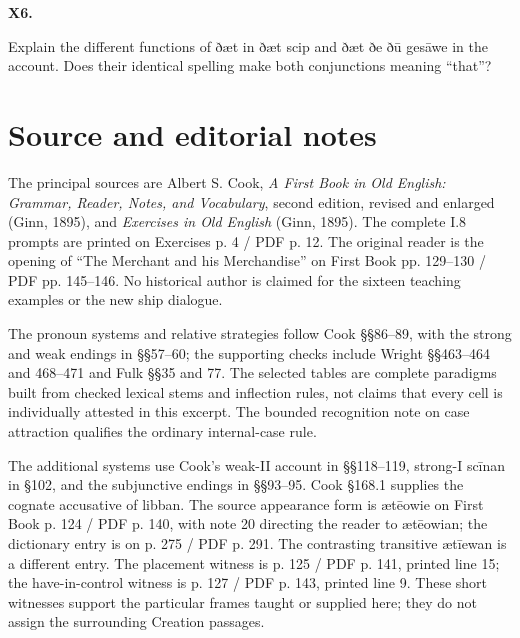 \par\begin{minipage}{\linewidth}\raggedright
\textbf{X6.}

Explain the different functions of ðæt in ðæt scip and ðæt ðe ðū gesāwe in the account. Does their identical spelling make both conjunctions meaning “that”?

\end{minipage}\par\addvspace{4pt}

\clearpage
\section*{Source and editorial notes}

\begingroup\fontsize{10}{12.8}\selectfont
\setlength{\parskip}{1.5pt}
The principal sources are Albert S. Cook, \emph{A First Book in Old English: Grammar, Reader, Notes, and Vocabulary}, second edition, revised and enlarged (Ginn, 1895), and \emph{Exercises in Old English} (Ginn, 1895). The complete I.8 prompts are printed on Exercises p. 4 /\allowbreak{} PDF p. 12. The original reader is the opening of “The Merchant and his Merchandise” on First Book pp. 129–130 /\allowbreak{} PDF pp. 145–146. No historical author is claimed for the sixteen teaching examples or the new ship dialogue.

The pronoun systems and relative strategies follow Cook §§86–89, with the strong and weak endings in §§57–60; the supporting checks include Wright §§463–464 and 468–471 and Fulk §§35 and 77. The selected tables are complete paradigms built from checked lexical stems and inflection rules, not claims that every cell is individually attested in this excerpt. The bounded recognition note on case attraction qualifies the ordinary internal-case rule.

The additional systems use Cook’s weak-II account in §§118–119, strong-I scīnan in §102, and the subjunctive endings in §§93–95. Cook §168.1 supplies the cognate accusative of libban. The source appearance form is ætēowie on First Book p. 124 /\allowbreak{} PDF p. 140, with note 20 directing the reader to ætēowian; the dictionary entry is on p. 275 /\allowbreak{} PDF p. 291. The contrasting transitive ætīewan is a different entry. The placement witness is p. 125 /\allowbreak{} PDF p. 141, printed line 15; the have-in-control witness is p. 127 /\allowbreak{} PDF p. 143, printed line 9. These short witnesses support the particular frames taught or supplied here; they do not assign the surrounding Creation passages.

